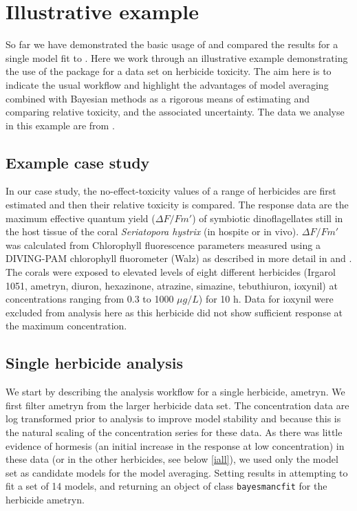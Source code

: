 \documentclass[
  shortnames]{jss}
\begin{document}
\section[Illustrative example]{Illustrative example}\label{iexample}

So far we have demonstrated the basic usage of  and compared the results for a single model fit to . Here we work through an illustrative example demonstrating the use of the package for a data set on herbicide toxicity. The aim here is to indicate the usual workflow and highlight the advantages of model averaging combined with Bayesian methods as a rigorous means of estimating and comparing relative toxicity, and the associated uncertainty. The data we analyse in this example are from \citet{jones2003meps}.

\hypertarget{example-case-study}{%
\subsection{Example case study}\label{example-case-study}}

In our case study, the no-effect-toxicity values of a range of herbicides are first estimated and then their relative toxicity is compared. The response data are the maximum effective quantum yield (\({\Delta F / Fm'}\)) of symbiotic dinoflagellates still in the host tissue of the coral \emph{Seriatopora hystrix} (in hospite or in vivo). \({\Delta F / Fm'}\) was calculated from Chlorophyll fluorescence parameters measured using a DIVING-PAM chlorophyll fluorometer (Walz) as described in more detail in \citet{jones2003meps} and \citet{jones2003effects}. The corals were exposed to elevated levels of eight different herbicides (Irgarol 1051, ametryn, diuron, hexazinone, atrazine, simazine, tebuthiuron, ioxynil) at concentrations ranging from 0.3 to 1000 \({\mu g/L}\)) for 10 h. Data for ioxynil were excluded from analysis here as this herbicide did not show sufficient response at the maximum concentration.

\subsection[Single herbicide]{Single herbicide analysis}\label{isingle}

We start by describing the analysis workflow for a single herbicide, ametryn. We first filter ametryn from the larger herbicide data set. The concentration data are log transformed prior to analysis to improve model stability and because this is the natural scaling of the concentration series for these data. As there was little evidence of hormesis (an initial increase in the response at low concentration) in these data (or in the other herbicides, see below \ref{iall}), we used only the  model set as candidate models for the model averaging. Setting  results in  attempting to fit a set of 14 models, and returning an object of class \texttt{bayesmancfit} for the herbicide ametryn.
\end{document}
